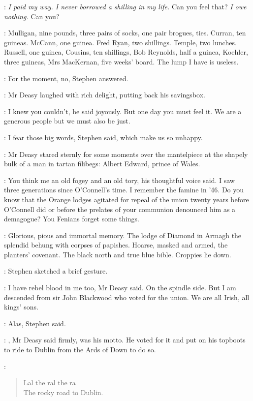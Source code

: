 \deasy:
\emph{I paid my way.
I never borrowed a shilling in my life.}
Can you feel that?
\emph{I owe nothing.}
Can you?

\StephenInt:
Mulligan, nine pounds, three pairs of socks, one pair brogues, ties.
Curran, ten guineas. McCann, one guinea. Fred Ryan, two shillings.
Temple, two lunches. Russell, one guinea, Cousins, ten shillings, Bob
Reynolds, half a guinea, Koehler, three guineas, Mrs MacKernan, five
weeks' board. The lump I have is useless.

\Stephen:
For the moment, no, Stephen answered.

:
Mr Deasy laughed with rich delight, putting back his savingsbox.

\deasy:
I knew you couldn't, he said joyously. But one day you must feel it.
We are a generous people but we must also be just.

\Stephen:
I fear those big words, Stephen said, which make us so unhappy.

:
Mr Deasy stared sternly for some moments over the mantelpiece at
the shapely bulk of a man in tartan filibegs: Albert Edward, prince of
Wales.

\deasy:
You think me an old fogey and an old tory, his thoughtful voice said. I
saw three generations since O'Connell's time. I remember the famine
in '46. Do you know that the Orange lodges agitated for repeal of the
union twenty years before O'Connell did or before the prelates of your
communion denounced him as a demagogue? You Fenians forget some things.

\StephenInt:
Glorious, pious and immortal memory. The lodge of Diamond in
Armagh the splendid behung with corpses of papishes. Hoarse, masked and
armed, the planters' covenant. The black north and true blue bible.
Croppies lie down.

:
Stephen sketched a brief gesture.

\deasy:
I have rebel blood in me too, Mr Deasy said. On the spindle side. But I
am descended from sir John Blackwood who voted for the union. We are all
Irish, all kings' sons.

\Stephen:
Alas, Stephen said.

\deasy:
, Mr Deasy said firmly, was his motto. He voted for it
and put on his topboots to ride to Dublin from the Ards of Down to do so.

\StephenInt:
\begin{verse}
    Lal the ral the ra \\
    The rocky road to Dublin.
\end{verse}

